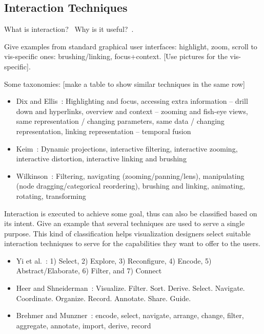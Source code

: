 %
%

\subsection{Interaction Techniques}
What is interaction?~\cite{Pike2009a} Why is it useful?~\cite{Munzner2014}. 

Give examples from standard graphical user interfaces: highlight, zoom, scroll to vis-specific ones: brushing/linking, focus+context. [Use pictures for the vis-specific].

Some taxonomies: [make a table to show similar techniques in the same row]
\begin{itemize}
	\item Dix and Ellis~\cite{Dix1998}: Highlighting and focus, accessing extra
	information -- drill down and hyperlinks, overview
	and context -- zooming and fish-eye views, same representation / changing
	parameters, same data / changing representation,
	linking representation – temporal fusion
	\item Keim~\cite{Keim2002}: Dynamic projections, interactive filtering,
	interactive zooming, interactive distortion,
	interactive linking and brushing
	\item Wilkinson~\cite{Wilkinson2005}: Filtering, navigating (zooming/panning/lens),
	manipulating (node dragging/categorical
	reordering), brushing and linking, animating, rotating, transforming
\end{itemize}

Interaction is executed to achieve some goal, thus can also be classified based on its intent. Give an example that several techniques are used to serve a single purpose. This kind of classification helps visualization designers select suitable interaction techniques to serve for the capabilities they want to offer to the users.


\begin{itemize}
	\item Yi et al.~\cite{Yi2007}: 1) Select, 2) Explore, 3) Reconfigure, 4) Encode, 5) Abstract/Elaborate, 6) Filter, and 7)
Connect
	\item Heer and Shneiderman~\cite{Heer2012}:  Visualize. Filter. Sort. Derive. Select. Navigate. Coordinate. Organize. Record. Annotate. Share. Guide.
	\item Brehmer and Munzner~\cite{Brehmer2013}: encode, select, navigate, arrange, change, filter, aggregate, annotate, import, derive, record
\end{itemize}


